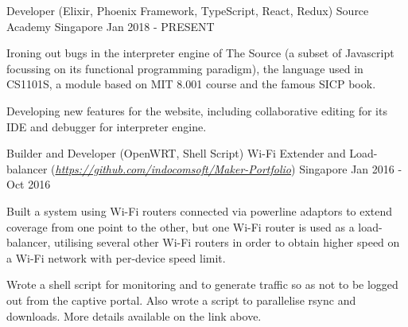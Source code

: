 \begin{cventries}
\cventry
    {Developer (Elixir, Phoenix Framework, TypeScript, React, Redux)} %
    {Source Academy} %
    {Singapore} %
    {Jan 2018 - PRESENT} %
    {
      \begin{cvitems} %
      	\item {Ironing out bugs in the interpreter engine of The Source (a subset of Javascript focussing on its functional programming paradigm), the language used in CS1101S, a module based on MIT 8.001 course and the famous SICP book.}
      	\item {Developing new features for the website, including collaborative editing for its IDE and debugger for interpreter engine.}
      \end{cvitems}
    }

\cventry
    {Builder and Developer (OpenWRT, Shell Script)} %
    {Wi-Fi Extender and Load-balancer (\textmd{\em \url{https://github.com/indocomsoft/Maker-Portfolio}})} %
    {Singapore} %
    {Jan 2016 - Oct 2016} %
    {
      \begin{cvitems} %
      	\item {Built a system using Wi-Fi routers connected via powerline adaptors to extend coverage from one point to the other, but one Wi-Fi router is used as a load-balancer, utilising several other Wi-Fi routers in order to obtain higher speed on a Wi-Fi network with per-device speed limit.}
      	\item {Wrote a shell script for monitoring and to generate traffic so as not to be logged out from the captive portal. Also wrote a script to parallelise rsync and downloads. More details available on the link above.}
      \end{cvitems}
    }
\end{cventries}
